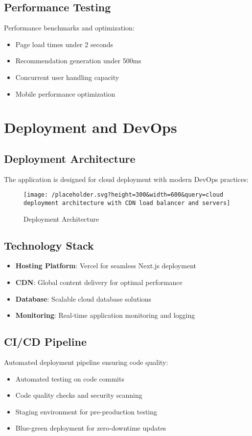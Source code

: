 \documentclass[12pt,a4paper]{article}
\begin{document}
\subsection{Performance Testing}
Performance benchmarks and optimization:
\begin{itemize}
    \item Page load times under 2 seconds
    \item Recommendation generation under 500ms
    \item Concurrent user handling capacity
    \item Mobile performance optimization
\end{itemize}

\newpage

\section{Deployment and DevOps}

\subsection{Deployment Architecture}
The application is designed for cloud deployment with modern DevOps practices:

\begin{figure}[H]
    \centering
    \texttt{[image: /placeholder.svg?height=300\&width=600\&query=cloud deployment architecture with CDN load balancer and servers]}
    \caption{Deployment Architecture}
    \label{fig:deployment}
\end{figure}

\subsection{Technology Stack}
\begin{itemize}
    \item \textbf{Hosting Platform}: Vercel for seamless Next.js deployment
    \item \textbf{CDN}: Global content delivery for optimal performance
    \item \textbf{Database}: Scalable cloud database solutions
    \item \textbf{Monitoring}: Real-time application monitoring and logging
\end{itemize}

\subsection{CI/CD Pipeline}
Automated deployment pipeline ensuring code quality:
\begin{itemize}
    \item Automated testing on code commits
    \item Code quality checks and security scanning
    \item Staging environment for pre-production testing
    \item Blue-green deployment for zero-downtime updates
\end{itemize}
\end{document}
